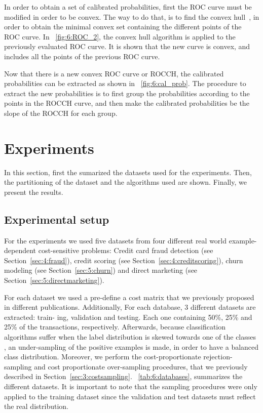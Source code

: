In order to obtain a set of calibrated probabilities, first the ROC curve must be modified in 
order to be convex. The way to do that, is to find the convex \mbox{hull 
\citep{Hernandez-Orallo2012}}, in order to obtain the minimal convex set containing the different 
points of the ROC curve. In \figurename{~\ref{fig:6:ROC_2}}, the convex hull algorithm is applied 
to the previously evaluated ROC curve. It is shown that the new curve is convex, and includes all 
the points of the previous ROC curve.

Now that there is a new convex ROC curve or ROCCH, the calibrated probabilities can be extracted 
as shown in  \figurename{~\ref{fig:6:cal_prob}}. The procedure to extract the new probabilities is 
to first group the probabilities according to the points in the ROCCH curve, and then make the 
calibrated  probabilities be the slope of the ROCCH for each group.
  
   
\section{Experiments}
\label{sec:6:experiments}

In this section, first the sumarized the datasets used for the experiments. Then, the 
partitioning of the dataset and the algorithms used are shown. Finally, we present the results.

\subsection{Experimental setup}

For the experiments we used five datasets from four different real world example-dependent 
cost-sensitive problems: Credit card fraud detection (see Section~\ref{sec:4:fraud}), credit 
scoring (see Section~\ref{sec:4:creditscoring}), churn modeling (see Section~\ref{sec:5:churn}) and 
direct marketing (see Section~\ref{sec:5:directmarketing}).

For each dataset we used a pre-define a cost matrix that we previously proposed in different 
publications. Additionally,  For each database, 3 different datasets are extracted: train-
ing, validation and testing. Each one containing 50\%, 25\% and 25\% of the transactions, 
respectively. Afterwards, because classification algorithms suffer when the label distribution is 
skewed towards one of the classes \citep{Hastie2009}, an under-sampling of the positive examples is 
made, in order to have a balanced class distribution. Moreover, we perform the cost-proportionate 
rejection-sampling and cost proportionate over-sampling procedures, that we previously described in 
Section~\ref{sec:3:costsampling}. \tablename{~\ref{tab:6:databases}}, summarizes the 
different datasets. It is important to note that the sampling procedures were only applied to the 
training dataset since the validation and test datasets must reflect the real distribution.

